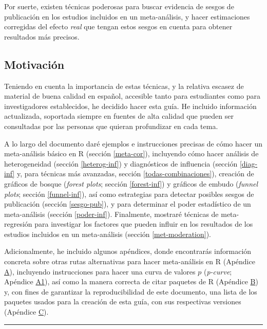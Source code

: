 \documentclass[
  bookmarksnumbered]{article}
\begin{document}
Por suerte, existen técnicas poderosas para buscar evidencia de sesgos de publicación en los estudios incluidos en un meta-análisis, y hacer estimaciones corregidas del efecto \emph{real} que tengan estos sesgos en cuenta para obtener resultados más precisos.

\hypertarget{motivaciuxf3n}{%
\subsection{Motivación}\label{motivaciuxf3n}}

Teniendo en cuenta la importancia de estas técnicas, y la relativa escasez de material de buena calidad en español, accesible tanto para estudiantes como para investigadores establecidos, he decidido hacer esta guía. He incluido información actualizada, soportada siempre en fuentes de alta calidad que pueden ser consultadas por las personas que quieran profundizar en cada tema.

A lo largo del documento daré ejemplos e instrucciones precisas de cómo hacer un meta-análisis básico en R (sección \ref{meta-cor}), incluyendo cómo hacer análisis de heterogeneidad (sección \ref{heterog-inf}) y diagnósticos de influencia (sección \ref{diag-inf} y, para técnicas más avanzadas, sección \ref{todas-combinaciones}), creación de gráficos de bosque (\emph{forest plots}; sección \ref{forest-inf}) y gráficos de embudo (\emph{funnel plots}; sección \ref{funnel-inf}), así como estrategias para detectar posibles sesgos de publicación (sección \ref{sesgo-pub}), y para determinar el poder estadístico de un meta-análisis (sección \ref{poder-inf}). Finalmente, mostraré técnicas de meta-regresión para investigar los factores que pueden influir en los resultados de los estudios incluidos en un meta-análisis (sección \ref{met-moderation}).

Adicionalmente, he incluido algunos apéndices, donde encontrarás información concreta sobre otras rutas alternativas para hacer meta-análisis en R (Apéndice \hyperlink{apendice-alt}{A}), incluyendo instrucciones para hacer una curva de valores \(p\) (\emph{p-curve}; Apéndice \hyperlink{p-curve}{A1}), así como la manera correcta de citar paquetes de R (Apéndice \hyperlink{paquetes-cit}{B}) y, con fines de garantizar la reproducibilidad de este documento, una lista de los paquetes usados para la creación de esta guía, con sus respectivas versiones (Apéndice \hyperlink{paquetes-list}{C}).

\begin{center}\rule{0.5\linewidth}{0.5pt}\end{center}
\end{document}
